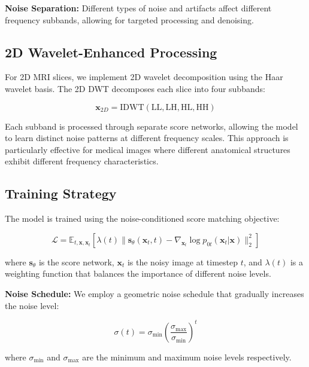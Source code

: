 \documentclass{midl} %
\begin{document}
\textbf{Noise Separation:} Different types of noise and artifacts affect different frequency subbands, allowing for targeted processing and denoising.

\subsection{2D Wavelet-Enhanced Processing}

For 2D MRI slices, we implement 2D wavelet decomposition using the Haar wavelet basis. The 2D DWT decomposes each slice into four subbands:

\begin{equation}
\mathbf{x}_{2D} = \text{IDWT}(\text{LL}, \text{LH}, \text{HL}, \text{HH})
\end{equation}

Each subband is processed through separate score networks, allowing the model to learn distinct noise patterns at different frequency scales. This approach is particularly effective for medical images where different anatomical structures exhibit different frequency characteristics.

\subsection{Training Strategy}

The model is trained using the noise-conditioned score matching objective:

\begin{equation}
\mathcal{L} = \mathbb{E}_{t,\mathbf{x},\mathbf{x}_t} \left[ \lambda(t) \|\mathbf{s}_\theta(\mathbf{x}_t, t) - \nabla_{\mathbf{x}_t} \log p_{0t}(\mathbf{x}_t|\mathbf{x})\|_2^2 \right]
\end{equation}

where $\mathbf{s}_\theta$ is the score network, $\mathbf{x}_t$ is the noisy image at timestep $t$, and $\lambda(t)$ is a weighting function that balances the importance of different noise levels.

\textbf{Noise Schedule:} We employ a geometric noise schedule that gradually increases the noise level:

\begin{equation}
\sigma(t) = \sigma_{\min} \left(\frac{\sigma_{\max}}{\sigma_{\min}}\right)^t
\end{equation}

where $\sigma_{\min}$ and $\sigma_{\max}$ are the minimum and maximum noise levels respectively.
\end{document}
